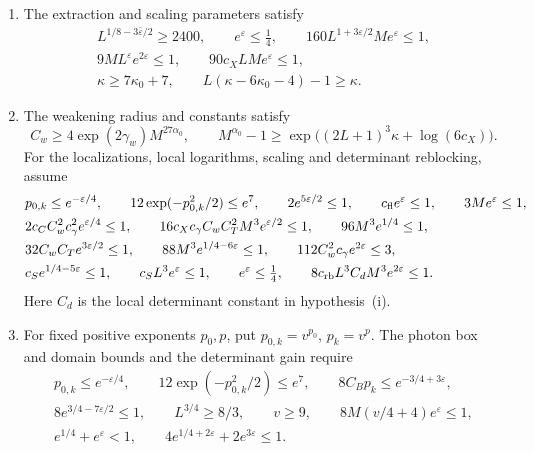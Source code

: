 \begin{theorem}
\begin{enumerate}[label=\textup{(\roman*)},leftmargin=*]
\item The extraction and scaling parameters satisfy
\begin{equation}\label{eq:nlm-normalization-hypotheses}
 \begin{gathered}
 L^{1/8-3\bar\varepsilon/2}\ge2400,\qquad e^\varepsilon\le\tfrac14,\qquad
 160L^{1+3\varepsilon/2}Me^\varepsilon\le1,\\
 9ML^\varepsilon e^{2\varepsilon}\le1,\qquad
 90c_XLMe^\varepsilon\le1,\\
 \kappa\ge7\kappa_0+7,\qquad
 L(\kappa-6\kappa_0-4)-1\ge\kappa .
 \end{gathered}
\end{equation}
\item The weakening radius and constants satisfy
\[
 C_w\ge4\exp(2\gamma_w)M^{27\alpha_0},\qquad
 M^{\alpha_0}-1\ge\exp\big((2L+1)^3\kappa+\log(6c_X)\big).
\]
For the localizations, local logarithms, scaling and determinant
reblocking, assume
\begin{align}
 &p_{0,k}\le e^{-\varepsilon/4},\qquad
       12\exp(-p_{0,k}^2/2)\le e^7,\qquad
       2e^{5\varepsilon/2}\le1,\qquad
       c_{\mathrm{fl}}e^\varepsilon\le1,\qquad3Me^\varepsilon\le1,
                                                        \notag\\
 &2c_CC_w^2c_\gamma^2e^{\varepsilon/4}\le1,\qquad
       16c_Xc_\gamma C_wC_T^2M^3e^{\varepsilon/2}\le1,\qquad
       96M^3e^{1/4}\le1,                                \notag\\
 &32C_wC_Te^{3\varepsilon/2}\le1,\qquad
       88M^3e^{1/4-6\varepsilon}\le1,\qquad
       112C_w^2c_\gamma e^{2\varepsilon}\le3,             \notag\\
 &c_Se^{1/4-5\varepsilon}\le1,\qquad
       c_SL^3e^\varepsilon\le1,\qquad e^\varepsilon\le\tfrac14,\qquad
       8c_{\mathrm{rb}}L^3C_dM^3e^{2\varepsilon}\le1.
                                      \label{eq:rgnl-fixed-smallness}
\end{align}
Here $C_d$ is the local determinant constant in hypothesis~(i).
\item For fixed positive exponents \(p_0,p\), put
\(p_{0,k}=v^{p_0}\), \(p_k=v^p\). The photon box and domain bounds
and the determinant gain require
\[
 \begin{gathered}
 p_{0,k}\le e^{-\varepsilon/4},\qquad
 12\exp(-p_{0,k}^2/2)\le e^7,\qquad
 8C_Bp_k\le e^{-3/4+3\varepsilon},\\
 8e^{3/4-7\varepsilon/2}\le1,\qquad L^{3/4}\ge8/3,\qquad
 v\ge9,\qquad 8M(v/4+4)e^\varepsilon\le1,\\
 e^{1/4}+e^\varepsilon<1,\qquad
 4e^{1/4+2\varepsilon}+2e^{3\varepsilon}\le1 .
 \end{gathered}
\]


\end{enumerate}
\end{theorem}
